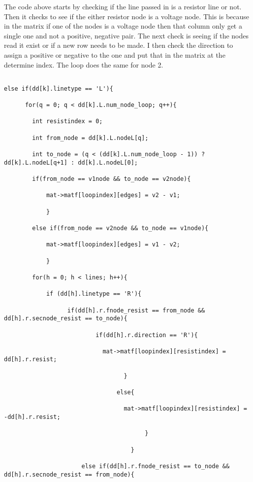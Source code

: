 \documentclass{article}
\begin{document}
The code above starts by checking if the line passed in is a resistor line or not. Then it checks to see if the either resistor node is a voltage node. This is because in the matrix if one of the nodes is a voltage node then that column only get a single one and not a positive, negative pair. The next check is seeing if the nodes read it exist or if a new row needs to be made. I then check the direction to assign a positive or negative to the one and put that in the matrix at the determine index. The loop does the same for node 2. 

\begin{lstlisting}

else if(dd[k].linetype == 'L'){

      for(q = 0; q < dd[k].L.num_node_loop; q++){

        int resistindex = 0;

        int from_node = dd[k].L.nodeL[q];

        int to_node = (q < (dd[k].L.num_node_loop - 1)) ? dd[k].L.nodeL[q+1] : dd[k].L.nodeL[0];

        if(from_node == v1node && to_node == v2node){

            mat->matf[loopindex][edges] = v2 - v1;

            }

        else if(from_node == v2node && to_node == v1node){

            mat->matf[loopindex][edges] = v1 - v2;

            }

        for(h = 0; h < lines; h++){

            if (dd[h].linetype == 'R'){

                  if(dd[h].r.fnode_resist == from_node && dd[h].r.secnode_resist == to_node){

                          if(dd[h].r.direction == 'R'){

                            mat->matf[loopindex][resistindex] = dd[h].r.resist;

                                  }

                                else{

                                  mat->matf[loopindex][resistindex] = -dd[h].r.resist;

                                        }

                                    }

                      else if(dd[h].r.fnode_resist == to_node && dd[h].r.secnode_resist == from_node){


\end{lstlisting}
\end{document}
